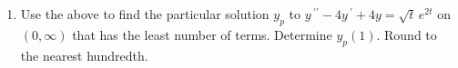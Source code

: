 \documentclass{ximera}
\begin{document}
\begin{enumerate}

\item[(10)] Use the above to find the particular solution $y_p$ to $y\,^{\prime\prime}-4 y\,^{\prime}+4 y=  \sqrt{t}\,e^{2t}$ on $(0,\infty)$ that has the least number of terms.   Determine $y_p(1)$.  Round to the nearest hundredth.





\end{enumerate}
\end{document}
